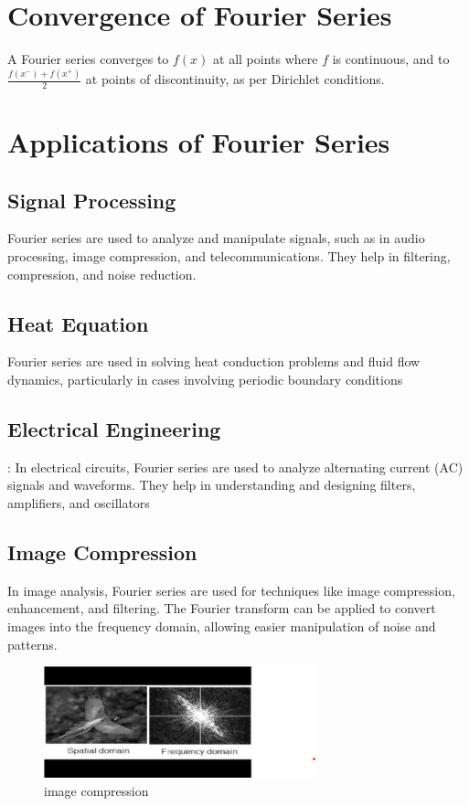 \documentclass[12pt,a4paper]{article}
\begin{document}
\section{Convergence of Fourier Series}
A Fourier series converges to \( f(x) \) at all points where \( f \) is continuous, and to \( \frac{f(x^-) + f(x^+)}{2} \) at points of discontinuity, as per Dirichlet conditions.

\section{Applications of Fourier Series}
\subsection{Signal Processing}
Fourier series are used to analyze and manipulate signals, such as in audio processing, image compression, and telecommunications. They help in filtering, compression, and noise reduction.

\subsection{Heat Equation}
Fourier series are used in solving heat conduction problems and fluid flow dynamics, particularly in cases involving periodic boundary conditions

\subsection{Electrical Engineering}
: In electrical circuits, Fourier series are used to analyze alternating current (AC) signals and waveforms. They help in understanding and designing filters, amplifiers, and oscillators

\subsection{Image Compression}
In image analysis, Fourier series are used for techniques like image compression, enhancement, and filtering. The Fourier transform can be applied to convert images into the frequency domain, allowing easier manipulation of noise and patterns.

\begin{figure}[H]
    \centering
    \includegraphics[width=0.7\textwidth]{image}
    \caption{image compression}
\end{figure}
\end{document}
